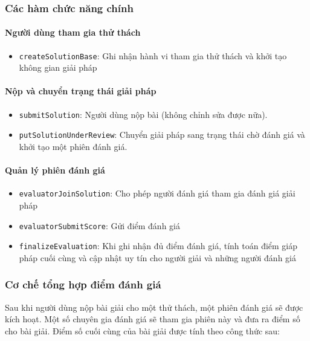 \subsubsection{Các hàm chức năng chính}

\paragraph{Người dùng tham gia thử thách}

\begin{itemize}
  \item \texttt{createSolutionBase}: Ghi nhận hành vi tham gia thử thách và khởi tạo không gian giải pháp
\end{itemize}

\paragraph{Nộp và chuyển trạng thái giải pháp}

\begin{itemize}
  \item \texttt{submitSolution}: Người dùng nộp bài (không chỉnh sửa được nữa).
  \item \texttt{putSolutionUnderReview}: Chuyển giải pháp sang trạng thái chờ đánh giá và khởi tạo một phiên đánh giá.
\end{itemize}

\paragraph{Quản lý phiên đánh giá}

\begin{itemize}
  \item \texttt{evaluatorJoinSolution}: Cho phép người đánh giá tham gia đánh giá giải pháp
  \item \texttt{evaluatorSubmitScore}: Gửi điểm đánh giá
  \item \texttt{finalizeEvaluation}: Khi ghi nhận đủ điểm đánh giá, tính toán điểm giáp pháp cuối cùng và cập nhật uy tín cho người giải và những người đánh giá
\end{itemize}

\subsubsection{Cơ chế tổng hợp điểm đánh giá}

Sau khi người dùng nộp bài giải cho một thử thách, một phiên đánh giá sẽ được kích hoạt. Một số chuyên gia đánh giá sẽ tham gia phiên này và đưa ra điểm số cho bài giải. Điểm số cuối cùng của bài giải được tính theo công thức sau:

